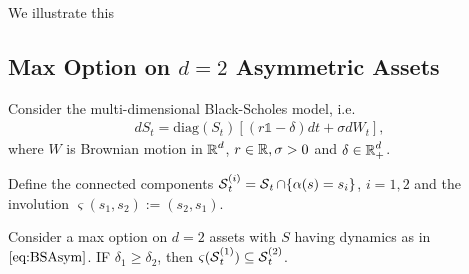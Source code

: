  We illustrate this %
 


\subsection{Max Option on $d=2$ Asymmetric Assets}\label{sec:maxCallAsym}
Consider the multi-dimensional Black-Scholes model, i.e. 
\begin{align}\label{eq:BSAsym}
    d S_t = \text{diag}(S_t) \left[ (r\mathds{1} - \delta)dt + \sigma dW_t\right],
\end{align}
where $W$ is Brownian motion in $\operatorname{\mathbb{R}}^d$, $r \in \operatorname{\mathbb{R}} ,\sigma > 0$ and $\delta \in \operatorname{\mathbb{R}}_+^d$. 

Define the connected components $\operatorname{\mathcal{S}}^{(i)}_t = \operatorname{\mathcal{S}}_t \cap \{\alpha(s) = s_i\}$, $i=1,2$ and the involution   $\varsigma(s_1,s_2) := (s_2,s_1)$.  

\begin{proposition} Consider a max option on $d=2$ assets with $S$ having dynamics as in $\eqref{eq:BSAsym}$. IF $\delta_1 \ge \delta_2$, then $\varsigma(\operatorname{\mathcal{S}}^{(1)}_t) \subseteq \operatorname{\mathcal{S}}^{(2)}_t$. 
\end{proposition}

